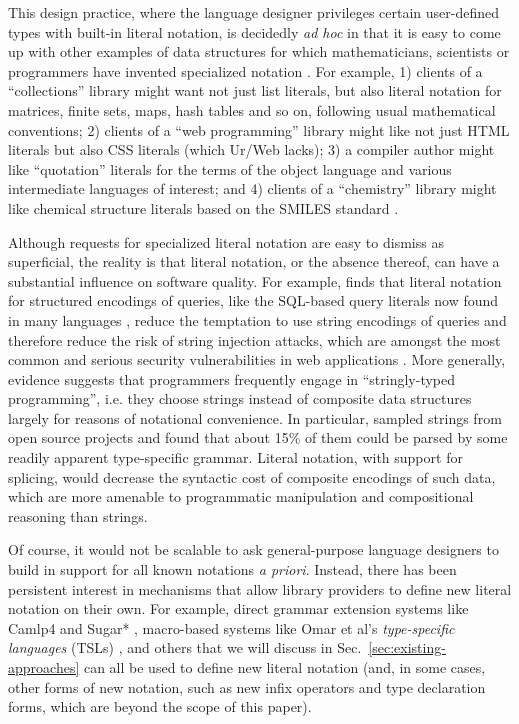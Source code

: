 \documentclass[acmsmall,review,anonymous]{acmart}\settopmatter{printfolios=true,printccs=false,printacmref=false}
\begin{document}
This design practice, where the language designer privileges certain user-defined types with built-in literal notation, is decidedly \emph{ad hoc} in that it is easy to come up with other examples of data structures for which mathematicians, scientists or programmers have invented specialized notation \cite{DBLP:journals/cacm/Iverson80,cajori1928history}. For example, 1) clients of a ``collections'' library might want not just list literals, but also literal notation for matrices, finite sets, maps, hash tables and so on, following usual mathematical conventions; 2) clients of a ``web programming'' library might like not just HTML literals but also CSS literals (which Ur/Web lacks); 3) a compiler author might like ``quotation'' literals for the terms of the object language and various intermediate languages of interest; and 4) clients of a ``chemistry'' library might like chemical structure literals based on the SMILES standard \cite{anderson1987smiles}.

Although requests for specialized literal notation are easy to dismiss as superficial, the reality is that literal notation, or the absence thereof, can have a substantial influence on software quality. For example, \citet{Bravenboer:2007:PIA:1289971.1289975} finds that literal notation for structured encodings of queries, like the SQL-based query literals now found in many languages \cite{meijer2006linq}, reduce the temptation to use string encodings of queries and therefore reduce the risk of string injection attacks, which are amongst the most common and serious security vulnerabilities in web applications \cite{owasp2017}. More generally, evidence suggests that programmers frequently engage in ``stringly-typed programming'', i.e. they choose strings instead of composite data structures largely for reasons of notational convenience. In particular, \citet{TSLs} sampled strings from open source projects and found that about 15\% of them could be parsed by some readily apparent type-specific grammar. Literal notation, with support for splicing, would decrease the syntactic cost of composite encodings of such data, which are more amenable to programmatic manipulation and compositional reasoning than strings. %



Of course, it would not be scalable to ask general-purpose language designers to build in support for all known notations \emph{a priori}. Instead, there has been persistent interest in mechanisms that allow library providers to define new literal notation on their own. For example, direct grammar extension systems like Camlp4 \cite{ocaml-manual} and Sugar* \cite{erdweg2011sugarj,erdweg2013framework}, macro-based systems like Omar et al's \emph{type-specific languages} (TSLs) \cite{TSLs}, and others that we will discuss in Sec.~\ref{sec:existing-approaches} can all be used to define new literal notation (and, in some cases, other forms of new notation, such as new infix operators and type declaration forms, which are beyond the scope of this paper).
\end{document}
